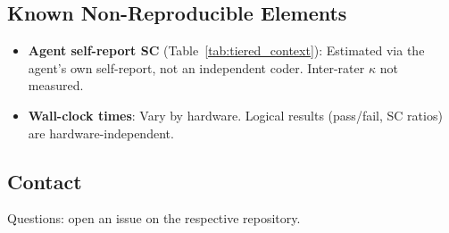 \subsection*{Known Non-Reproducible Elements}

\begin{itemize}
\item \textbf{Agent self-report SC} (Table~\ref{tab:tiered_context}): Estimated via the agent's own self-report, not an independent coder. Inter-rater $\kappa$ not measured.
\item \textbf{Wall-clock times}: Vary by hardware. Logical results (pass/fail, SC ratios) are hardware-independent.
\end{itemize}

\subsection*{Contact}

Questions: open an issue on the respective repository.